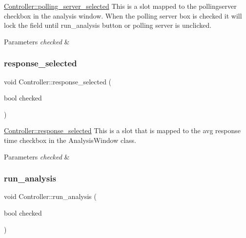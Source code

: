 \hyperlink{classController_aeca721bb54b3495d2a490d6f658799a5}{Controller\+::polling\+\_\+server\+\_\+selected} This is a slot mapped to the pollingserver checkbox in the analysis window. When the polling server box is checked it will lock the field until run\+\_\+analysis button or polling server is unclicked. 


\begin{DoxyParams}{Parameters}
{\em checked} & \\
\hline
\end{DoxyParams}
\mbox{\label{classController_a04531b0d9ee8f02677b1a562a2607ada}} 
\subsubsection{\texorpdfstring{response\+\_\+selected}{response\_selected}}
{\footnotesize\ttfamily void Controller\+::response\+\_\+selected (\begin{DoxyParamCaption}\item[{bool}]{checked }\end{DoxyParamCaption})\hspace{0.3cm}{\ttfamily [slot]}}



\hyperlink{classController_a04531b0d9ee8f02677b1a562a2607ada}{Controller\+::response\+\_\+selected} This is a slot that is mapped to the avg response time checkbox in the Analysis\+Window class. 


\begin{DoxyParams}{Parameters}
{\em checked} & \\
\hline
\end{DoxyParams}
\mbox{\label{classController_a7ff7d2d0e8614494020bf5e35dc663a8}} 
\subsubsection{\texorpdfstring{run\+\_\+analysis}{run\_analysis}}
{\footnotesize\ttfamily void Controller\+::run\+\_\+analysis (\begin{DoxyParamCaption}\item[{bool}]{checked }\end{DoxyParamCaption})\hspace{0.3cm}{\ttfamily [slot]}}



